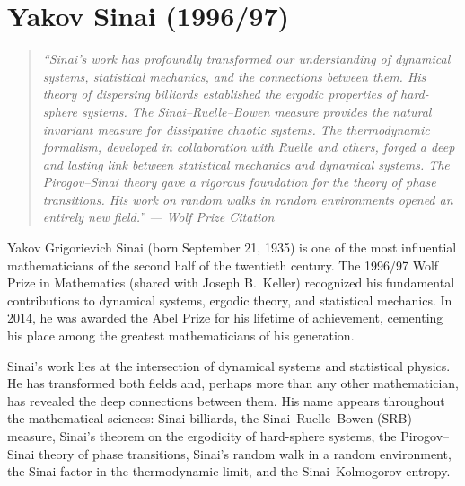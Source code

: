 \let\R\relax
\newcommand{\R}{\mathbb{R}}
\let\C\relax
\newcommand{\C}{\mathbb{C}}
\let\N\relax
\newcommand{\N}{\mathbb{N}}
\let\Z\relax
\newcommand{\Z}{\mathbb{Z}}
\let\Q\relax
\newcommand{\Q}{\mathbb{Q}}
\let\SO\relax
\newcommand{\SO}{\operatorname{SO}}
\let\SL\relax
\newcommand{\SL}{\operatorname{SL}}
\let\GL\relax
\newcommand{\GL}{\operatorname{GL}}
\let\St\relax
\newcommand{\St}{\operatorname{St}}
\let\GV\relax
\newcommand{\GV}{\operatorname{GV}}
\let\E\relax
\newcommand{\E}{\operatorname{E}}

\chapter{Yakov Sinai (1996/97)}

\begin{quote}
\it ``Sinai's work has profoundly transformed our understanding of dynamical systems, statistical mechanics, and the connections between them. His theory of dispersing billiards established the ergodic properties of hard-sphere systems. The Sinai--Ruelle--Bowen measure provides the natural invariant measure for dissipative chaotic systems. The thermodynamic formalism, developed in collaboration with Ruelle and others, forged a deep and lasting link between statistical mechanics and dynamical systems. The Pirogov--Sinai theory gave a rigorous foundation for the theory of phase transitions. His work on random walks in random environments opened an entirely new field.'' --- Wolf Prize Citation
\end{quote}

Yakov Grigorievich Sinai (born September 21, 1935) is one of the most influential mathematicians of the second half of the twentieth century. The 1996/97 Wolf Prize in Mathematics (shared with Joseph B.\ Keller) recognized his fundamental contributions to dynamical systems, ergodic theory, and statistical mechanics. In 2014, he was awarded the Abel Prize for his lifetime of achievement, cementing his place among the greatest mathematicians of his generation.

Sinai's work lies at the intersection of dynamical systems and statistical physics. He has transformed both fields and, perhaps more than any other mathematician, has revealed the deep connections between them. His name appears throughout the mathematical sciences: Sinai billiards, the Sinai--Ruelle--Bowen (SRB) measure, Sinai's theorem on the ergodicity of hard-sphere systems, the Pirogov--Sinai theory of phase transitions, Sinai's random walk in a random environment, the Sinai factor in the thermodynamic limit, and the Sinai--Kolmogorov entropy.

